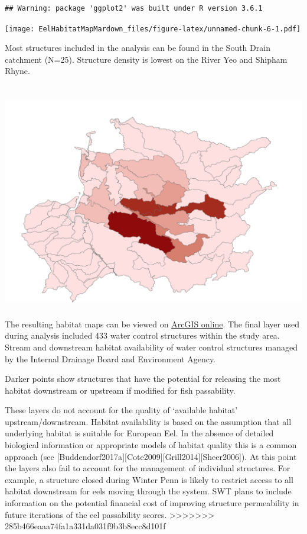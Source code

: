 \documentclass[]{article}
\begin{document}
\begin{verbatim}
## Warning: package 'ggplot2' was built under R version 3.6.1
\end{verbatim}

\texttt{[image: EelHabitatMapMardown\_files/figure-latex/unnamed-chunk-6-1.pdf]}

Most structures included in the analysis can be found in the South Drain
catchment (N=25). Structure density is lowest on the River Yeo and
Shipham Rhyne.

\hypertarget{water-control-structure-density-by-catchment}{%
\section{\texorpdfstring{\protect\includegraphics{AxeBrue_RIVEX_190219_StructureDen_.jpg}}{Water control structure density by catchment}}\label{water-control-structure-density-by-catchment}}

The resulting habitat maps can be viewed on
\href{http://arcg.is/8qavW}{ArcGIS online}. The final layer used during
analysis included 433 water control structures within the study area.
Stream and downstream habitat availability of water control structures
managed by the Internal Drainage Board and Environment Agency.

Darker points show structures that have the potential for releasing the
most habitat downstream or upstream if modified for fish passability.

These layers do not account for the quality of `available habitat'
upstream/downstream. Habitat availability is based on the assumption
that all underlying habitat is suitable for European Eel. In the absence
of detailed biological information or appropriate models of habitat
quality this is a common approach (see
{[}Buddendorf2017a{]}{[}Cote2009{]}{[}Grill2014{]}{[}Sheer2006{]}). At
this point the layers also fail to account for the management of
individual structures. For example, a structure closed during Winter
Penn is likely to restrict access to all habitat downstream for eels
moving through the system. SWT plans to include information on the
potential financial cost of improving structure permeability in future
iterations of the eel passability scores.
\textgreater{}\textgreater{}\textgreater{}\textgreater{}\textgreater{}\textgreater{}\textgreater{}
285b466eaaa74fa1a331da031f9b3b8ecc8d101f
\end{document}
